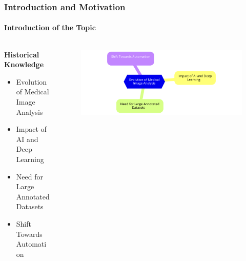 \documentclass[aspectratio=169, lecture, amberg]{OTHAWbeamer}
\begin{document}
  \begin{frame}
    \frametitle{Introduction and Motivation}
    \framesubtitle{Introduction of the Topic}
    
    \begin{columns}[T] %
        \begin{column}{0.5\textwidth}
            \textbf{Historical Knowledge}
            \begin{itemize}
                \item Evolution of Medical Image Analysis
                \vspace{0.4cm}
                \item Impact of AI and Deep Learning
                \vspace{0.4cm}
                \item Need for Large Annotated Datasets
                \vspace{0.4cm}
                \item Shift Towards Automation
            \end{itemize}
        \end{column}
        
        \begin{column}{0.52\textwidth}
            \begin{figure}
                \centering
                \hspace*{-1cm}
                \includegraphics[width=1.3\linewidth]{AI_evolution.png} %
            \end{figure}
        \end{column}
    \end{columns}
    
\end{frame}
\end{document}
